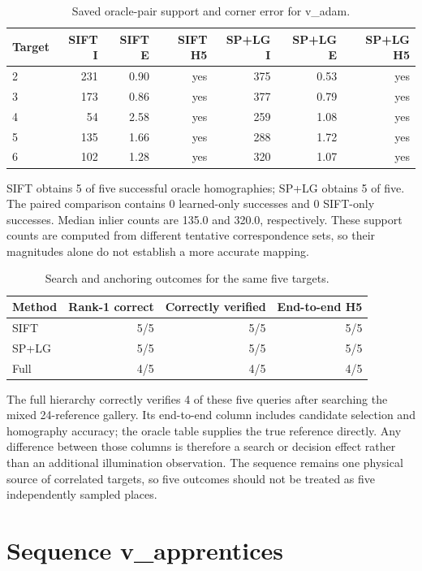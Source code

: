\begin{table}[H]\centering\small
\caption{Saved oracle-pair support and corner error for v\_adam.}\label{tab:hp-pairs-13}
\begin{tabular}{lrrrrrr}\toprule
Target & SIFT I & SIFT E & SIFT H5 & SP+LG I & SP+LG E & SP+LG H5 \\
\midrule
2 & 231 & 0.90 & yes & 375 & 0.53 & yes \\
3 & 173 & 0.86 & yes & 377 & 0.79 & yes \\
4 & 54 & 2.58 & yes & 259 & 1.08 & yes \\
5 & 135 & 1.66 & yes & 288 & 1.72 & yes \\
6 & 102 & 1.28 & yes & 320 & 1.07 & yes \\
\bottomrule\end{tabular}\end{table}


SIFT obtains 5 of five successful oracle homographies; SP+LG obtains 5 of five. The paired comparison contains 0 learned-only successes and 0 SIFT-only successes. Median inlier counts are 135.0 and 320.0, respectively. These support counts are computed from different tentative correspondence sets, so their magnitudes alone do not establish a more accurate mapping.

\begin{table}[H]\centering\small
\caption{Search and anchoring outcomes for the same five targets.}\label{tab:hp-end-13}
\begin{tabular}{lrrr}\toprule
Method & Rank-1 correct & Correctly verified & End-to-end H5 \\
\midrule
SIFT & 5/5 & 5/5 & 5/5 \\
SP+LG & 5/5 & 5/5 & 5/5 \\
Full & 4/5 & 4/5 & 4/5 \\
\bottomrule\end{tabular}\end{table}


The full hierarchy correctly verifies 4 of these five queries after searching the mixed 24-reference gallery. Its end-to-end column includes candidate selection and homography accuracy; the oracle table supplies the true reference directly. Any difference between those columns is therefore a search or decision effect rather than an additional illumination observation. The sequence remains one physical source of correlated targets, so five outcomes should not be treated as five independently sampled places.

\section{Sequence v\_apprentices}

